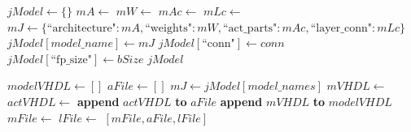 \begin{algorithm}[htbp]
    \caption{Parse Models to JSON Representation}\label{alg:parse}
    \begin{algorithmic}[1]
        \State $jModel \gets \{\}$
            \State $mA \gets$ 
            \State $mW \gets$ 
            \State $mAc \gets$ 
            \State $mLc \gets$ 
            \State $mJ \gets \{\text{``architecture"}: mA, \text{``weights"}: mW, \text{``act\_parts"}: mAc, \text{``layer\_conn"}: mLc\}$
            \State $jModel[model\_name] \gets mJ$
        \EndFor
        \State $jModel[\text{``conn"}] \gets conn$
        \State $jModel[\text{``fp\_size"}] \gets bSize$
        \State \Return $jModel$
    \EndFunction
    \end{algorithmic}
\end{algorithm}

\begin{algorithm}[htbp]
    \caption{Write \gls{vhdl} Files from JSON Representation}\label{alg:write-vhdl}
    \begin{algorithmic}[1]
        \State $modelVHDL \gets []$
        \State $aFile \gets []$
                \State $mJ \gets jModel[model\_names]$
                \State $mVHDL \gets$ 
                \State $actVHDL \gets$ 
                \State \textbf{append} $actVHDL$ \textbf{to} $aFile$
                \State \textbf{append} $mVHDL$ \textbf{to} $modelVHDL$
            \EndFor
        \EndFor
        \State $mFile \gets$ 
        \State $lFile \gets$ 
        \State \Return $[mFile, aFile, lFile]$
    \EndFunction
    \end{algorithmic}
\end{algorithm}


